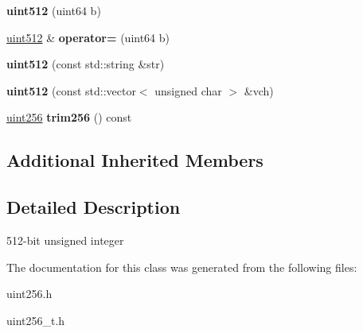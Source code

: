 \begin{DoxyCompactItemize}
{\bfseries uint512} (uint64 b)
\item 
\mbox{\label{classuint512_ac31f24d9f27baf61191d6c25e9a9a0d1}} 
\mbox{\hyperlink{classuint512}{uint512}} \& {\bfseries operator=} (uint64 b)
\item 
\mbox{\label{classuint512_a407d2a7a59005a57e848327014c7d2b5}} 
{\bfseries uint512} (const std\+::string \&str)
\item 
\mbox{\label{classuint512_a017c6e9933a94a0d9b2eb2fff280065a}} 
{\bfseries uint512} (const std\+::vector$<$ unsigned char $>$ \&vch)
\item 
\mbox{\label{classuint512_a90ae45972cae81e4e2d941ebe927b65c}} 
\mbox{\hyperlink{classuint256}{uint256}} {\bfseries trim256} () const
\end{DoxyCompactItemize}
\subsection*{Additional Inherited Members}


\subsection{Detailed Description}
512-\/bit unsigned integer 

The documentation for this class was generated from the following files\+:\begin{DoxyCompactItemize}
\item 
uint256.\+h\item 
uint256\+\_\+t.\+h\end{DoxyCompactItemize}
